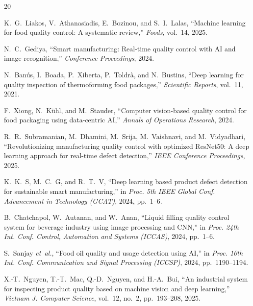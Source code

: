\documentclass{ieeeaccess}
\begin{document}

\begin{thebibliography}{20}

K.~G.~Liakos, V.~Athanasiadis, E.~Bozinou, and S.~I.~Lalas, ``Machine learning for food quality control: A systematic review,'' \emph{Foods}, vol.~14, 2025.

N.~C.~Gediya, ``Smart manufacturing: Real-time quality control with AI and image recognition,'' \emph{Conference Proceedings}, 2024.

N.~Ban\'{u}s, I.~Boada, P.~Xiberta, P.~Toldr\`{a}, and N.~Bustins, ``Deep learning for quality inspection of thermoforming food packages,'' \emph{Scientific Reports}, vol.~11, 2021.

F.~Xiong, N.~K\"uhl, and M.~Stauder, ``Computer vision-based quality control for food packaging using data-centric AI,'' \emph{Annals of Operations Research}, 2024.

R.~R.~Subramanian, M.~Dhamini, M.~Srija, M.~Vaishnavi, and M.~Vidyadhari, ``Revolutionizing manufacturing quality control with optimized ResNet50: A deep learning approach for real-time defect detection,'' \emph{IEEE Conference Proceedings}, 2025.

K.~K.~S, M.~C.~G, and R.~T.~V, ``Deep learning based product defect detection for sustainable smart manufacturing,'' in \emph{Proc. 5th IEEE Global Conf. Advancement in Technology (GCAT)}, 2024, pp.~1--6.

B.~Chatchapol, W.~Autanan, and W.~Anan, ``Liquid filling quality control system for beverage industry using image processing and CNN,'' in \emph{Proc. 24th Int. Conf. Control, Automation and Systems (ICCAS)}, 2024, pp.~1--6.

S.~Sanjay \emph{et~al.}, ``Food oil quality and usage detection using AI,'' in \emph{Proc. 10th Int. Conf. Communication and Signal Processing (ICCSP)}, 2024, pp.~1190--1194.

X.-T.~Nguyen, T.-T.~Mac, Q.-D.~Nguyen, and H.-A.~Bui, ``An industrial system for inspecting product quality based on machine vision and deep learning,'' \emph{Vietnam J. Computer Science}, vol.~12, no.~2, pp.~193--208, 2025.


\end{thebibliography}
\end{document}
